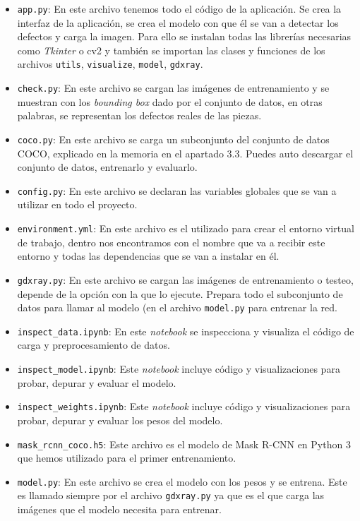 \begin{itemize}
    \item \texttt{app.py}: En este archivo tenemos todo el código de la aplicación. Se crea la interfaz de la aplicación, se crea el modelo con que él se van a detectar los defectos y carga la imagen. Para ello se instalan todas las librerías necesarias como \textit{Tkinter} o cv2 y también se importan las clases y funciones de los archivos \texttt{utils}, \texttt{visualize}, \texttt{model}, \texttt{gdxray}.
    \item \texttt{check.py}: En este archivo se cargan las imágenes de entrenamiento y se muestran con los \textit{bounding box} dado por el conjunto de datos, en otras palabras, se representan los defectos reales de las piezas.
    \item \texttt{coco.py}: En este archivo se carga un subconjunto del conjunto de datos COCO, explicado en la memoria en el apartado 3.3. Puedes auto descargar el conjunto de datos, entrenarlo y evaluarlo.
    \item \texttt{config.py}: En este archivo se declaran las variables globales que se van a utilizar en todo el proyecto.
    \item \texttt{environment.yml}: En este archivo es el utilizado para crear el entorno virtual de trabajo, dentro nos encontramos con el nombre que va a recibir este entorno y todas las dependencias que se van a instalar en él.
    \item \texttt{gdxray.py}: En este archivo se cargan las imágenes de entrenamiento o testeo, depende de la opción con la que lo ejecute. Prepara todo el subconjunto de datos para llamar al modelo (en el archivo \texttt{model.py} para entrenar la red.
    \item \texttt{inspect\_data.ipynb}: En este \textit{notebook} se inspecciona y visualiza el código de carga y preprocesamiento de datos.
    \item \texttt{inspect\_model.ipynb}: Este \textit{notebook} incluye código y visualizaciones para probar, depurar y evaluar el modelo.
    \item \texttt{inspect\_weights.ipynb}: Este \textit{notebook} incluye código y visualizaciones para probar, depurar y evaluar los pesos del modelo.
    \item \texttt{mask\_rcnn\_coco.h5}: Este archivo es el modelo de Mask R-CNN en Python 3 que hemos utilizado para el primer entrenamiento.
    \item \texttt{model.py}: En este archivo se crea el modelo con los pesos y se entrena. Este es llamado siempre por el archivo \texttt{gdxray.py} ya que es el que carga las imágenes que el modelo necesita para entrenar.

\end{itemize}
